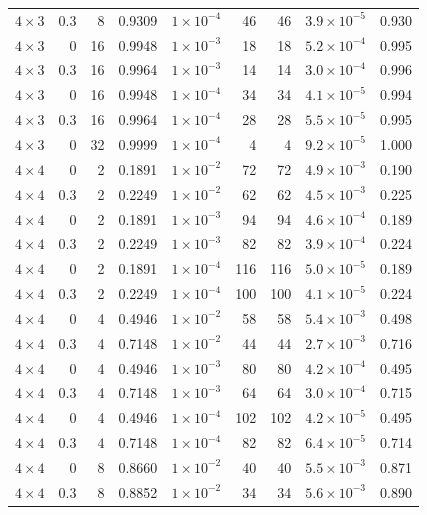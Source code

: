 \documentclass[10pt]{article}
\begin{document}
\begin{table}[h]
\begin{tabular}{lrrrcrrcc}
$4\times3$ & 0.3 & 8 & 0.9309 & $1\times10^{-4}$ & 46 & 46 & $3.9\times10^{-5}$ & 0.930 \\
$4\times3$ & 0 & 16 & 0.9948 & $1\times10^{-3}$ & 18 & 18 & $5.2\times10^{-4}$ & 0.995 \\
$4\times3$ & 0.3 & 16 & 0.9964 & $1\times10^{-3}$ & 14 & 14 & $3.0\times10^{-4}$ & 0.996 \\
$4\times3$ & 0 & 16 & 0.9948 & $1\times10^{-4}$ & 34 & 34 & $4.1\times10^{-5}$ & 0.994 \\
$4\times3$ & 0.3 & 16 & 0.9964 & $1\times10^{-4}$ & 28 & 28 & $5.5\times10^{-5}$ & 0.995 \\
$4\times3$ & 0 & 32 & 0.9999 & $1\times10^{-4}$ & 4 & 4 & $9.2\times10^{-5}$ & 1.000 \\
$4\times4$ & 0 & 2 & 0.1891 & $1\times10^{-2}$ & 72 & 72 & $4.9\times10^{-3}$ & 0.190 \\
$4\times4$ & 0.3 & 2 & 0.2249 & $1\times10^{-2}$ & 62 & 62 & $4.5\times10^{-3}$ & 0.225 \\
$4\times4$ & 0 & 2 & 0.1891 & $1\times10^{-3}$ & 94 & 94 & $4.6\times10^{-4}$ & 0.189 \\
$4\times4$ & 0.3 & 2 & 0.2249 & $1\times10^{-3}$ & 82 & 82 & $3.9\times10^{-4}$ & 0.224 \\
$4\times4$ & 0 & 2 & 0.1891 & $1\times10^{-4}$ & 116 & 116 & $5.0\times10^{-5}$ & 0.189 \\
$4\times4$ & 0.3 & 2 & 0.2249 & $1\times10^{-4}$ & 100 & 100 & $4.1\times10^{-5}$ & 0.224 \\
$4\times4$ & 0 & 4 & 0.4946 & $1\times10^{-2}$ & 58 & 58 & $5.4\times10^{-3}$ & 0.498 \\
$4\times4$ & 0.3 & 4 & 0.7148 & $1\times10^{-2}$ & 44 & 44 & $2.7\times10^{-3}$ & 0.716 \\
$4\times4$ & 0 & 4 & 0.4946 & $1\times10^{-3}$ & 80 & 80 & $4.2\times10^{-4}$ & 0.495 \\
$4\times4$ & 0.3 & 4 & 0.7148 & $1\times10^{-3}$ & 64 & 64 & $3.0\times10^{-4}$ & 0.715 \\
$4\times4$ & 0 & 4 & 0.4946 & $1\times10^{-4}$ & 102 & 102 & $4.2\times10^{-5}$ & 0.495 \\
$4\times4$ & 0.3 & 4 & 0.7148 & $1\times10^{-4}$ & 82 & 82 & $6.4\times10^{-5}$ & 0.714 \\
$4\times4$ & 0 & 8 & 0.8660 & $1\times10^{-2}$ & 40 & 40 & $5.5\times10^{-3}$ & 0.871 \\
$4\times4$ & 0.3 & 8 & 0.8852 & $1\times10^{-2}$ & 34 & 34 & $5.6\times10^{-3}$ & 0.890 \\

\end{tabular}
\end{table}
\end{document}
